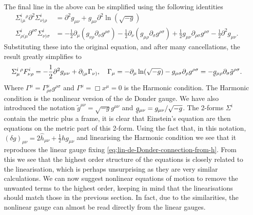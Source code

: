 \documentclass[10pt]{report}
\newcommand{\utilde}[1]{\underaccent{\tilde}{#1}}
\theoremstyle{definition}
\newcommand{\tg}[0]{\tilde{g}}
\begin{document}
        The final line in the above can be simplified using the following identities
        \begin{align}
            \Sigma^i_{(\mu}{}^\rho \partial^2 \Sigma^i_{\nu)\rho} &= \partial^2 g_{\mu\nu} + g_{\mu\nu} \partial^2 \ln(\sqrt{-g}) \\ \Sigma^i_{\rho(\mu} \partial^{\rho\sigma} \Sigma^i_{\nu)\sigma} &= -\frac{1}{2} \partial_\mu (g_{\nu\rho} \partial_\sigma g^{\rho\sigma}) -\frac{1}{2} \partial_\nu (g_{\mu\rho} \partial_\sigma g^{\rho\sigma}) + \frac{1}{2} g_{\mu\nu} \partial_{\rho\sigma} g^{\rho\sigma} - \frac{1}{2} \partial^2 g_{\mu\nu}.
        \end{align}
        Substituting these into the original equation, and after many cancellations, the result greatly simplifies to
        \begin{align}
            \Sigma^i_{\mu}{}^\rho F^i_{\nu\rho} = -\frac{1}{2} \partial^2 g_{\mu\nu} + \partial_{(\mu} \Gamma_{\nu)}, \quad \Gamma_\mu = -\partial_\mu \ln(\sqrt{-g}) - g_{\mu\sigma} \partial_\rho g^{\rho\sigma} = - \utilde{g}_{\mu\rho} \partial_\sigma \tg^{\rho\sigma}. \label{eq:nonlinear-einstein-equations-as-box-g-plus-H}
        \end{align}
        Where $\Gamma^\mu = \Gamma^\mu_{\rho\sigma} g^{\rho\sigma}$ and $\Gamma^\mu = \Box x^\mu = 0$ is the Harmonic condition. The Harmonic condition is the nonlinear version of the de Donder gauge. We have also introduced the notation $\tg^{\mu\nu} = \sqrt{-g} g^{\mu\nu}$ and $\utilde{g}_{\mu\nu} = g_{\mu\nu}/\sqrt{-g}$. The 2-forms $\Sigma^i$ contain the metric plus a frame, it is clear that Einstein's equation are then equations on the metric part of this 2-form. Using the fact that, in this notation, $(\delta g)_{\mu\nu} = 2 \hat{h}_{\mu\nu} + \frac{1}{2} h g_{\mu\nu}$ and linearising the Harmonic condition we see that it reproduces the linear gauge fixing \cref{eq:lin-de-Donder-connection-from-h}. From this we see that the highest order structure of the equations is closely related to the linearisation, which is perhaps unsurprising as they are very similar calculations. We can now suggest nonlinear equations of motion to remove the unwanted terms to the highest order, keeping in mind that the linearisations should match those in the previous section. In fact, due to the similarities, the nonlinear gauge can almost be read directly from the linear gauges.
\end{document}
